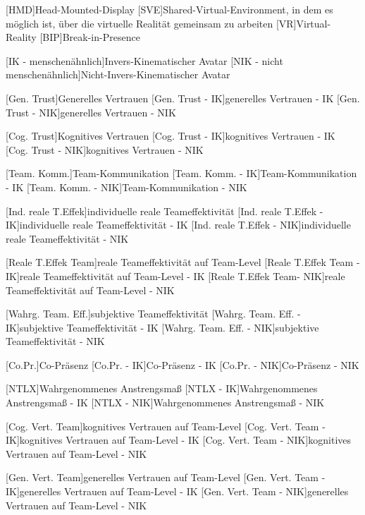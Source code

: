 \begin{acronym}
	[HMD]{Head-Mounted-Display}
	[SVE]{Shared-Virtual-Environment, in dem es möglich ist, über die virtuelle Realität gemeinsam zu arbeiten}
	[VR]{Virtual-Reality}
	[BIP]{Break-in-Presence}
	
	[IK - menschenähnlich]{Invers-Kinematischer Avatar}
	[NIK - nicht menschenähnlich]{Nicht-Invers-Kinematischer Avatar}
	
	[Gen. Trust]{Generelles Vertrauen}
	[Gen. Trust - IK]{generelles Vertrauen - IK}
	[Gen. Trust - NIK]{generelles Vertrauen - NIK}
	
	[Cog. Trust]{Kognitives Vertrauen}
	[Cog. Trust - IK]{kognitives Vertrauen - IK}
	[Cog. Trust - NIK]{kognitives Vertrauen - NIK}
	
	[Team. Komm.]{Team-Kommunikation}
	[Team. Komm. - IK]{Team-Kommunikation - IK}
	[Team. Komm. - NIK]{Team-Kommunikation - NIK}
	
	[Ind. reale T.Effek]{individuelle reale Teameffektivität}
	[Ind. reale T.Effek - IK]{individuelle reale Teameffektivität - IK}
	[Ind. reale T.Effek - NIK]{individuelle reale Teameffektivität - NIK}	
	
	[Reale T.Effek Team]{reale Teameffektivität auf Team-Level}
	[Reale T.Effek Team - IK]{reale Teameffektivität auf Team-Level - IK}
	[Reale T.Effek Team- NIK]{reale Teameffektivität auf Team-Level - NIK}
	
	[Wahrg. Team. Eff.]{subjektive Teameffektivität}
	[Wahrg. Team. Eff. - IK]{subjektive Teameffektivität - IK}
	[Wahrg. Team. Eff. - NIK]{subjektive Teameffektivität - NIK}
	
	[Co.Pr.]{Co-Präsenz}
	[Co.Pr. - IK]{Co-Präsenz - IK}
	[Co.Pr. - NIK]{Co-Präsenz - NIK}
	
	[NTLX]{Wahrgenommenes Anstrengsmaß}
	[NTLX - IK]{Wahrgenommenes Anstrengsmaß - IK}
	[NTLX - NIK]{Wahrgenommenes Anstrengsmaß - NIK}
	
	[Cog. Vert. Team]{kognitives Vertrauen auf Team-Level}
	[Cog. Vert. Team - IK]{kognitives Vertrauen auf Team-Level - IK}
	[Cog. Vert. Team - NIK]{kognitives Vertrauen auf Team-Level - NIK}
	
	[Gen. Vert. Team]{generelles Vertrauen auf Team-Level}
	[Gen. Vert. Team - IK]{generelles Vertrauen auf Team-Level - IK}
	[Gen. Vert. Team - NIK]{generelles Vertrauen auf Team-Level - NIK}
	

\end{acronym}
